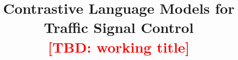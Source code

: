 \documentclass[conference]{IEEEtran}
\newif\ifdraft
\newcommand{\tbd}[1][]{\textcolor{red}{[TBD#1]}}
\newcommand{\tbd}[1][]{}
\begin{document}
\title{Contrastive Language Models for Traffic Signal Control\\
\large\tbd[: working title]}

\author{
\IEEEauthorblockA{\tbd[: affiliation]}}

\maketitle













\ifdraft
\clearpage
\listoftodos
\fi
\end{document}
